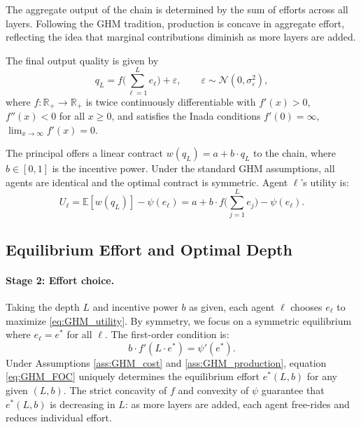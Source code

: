 The aggregate output of the chain is determined by the sum of efforts across all layers. Following the GHM tradition, production is concave in aggregate effort, reflecting the idea that marginal contributions diminish as more layers are added.

\begin{assumption}
\label{ass:GHM_production}
The final output quality is given by
\begin{equation}
\label{eq:GHM_production}
q_L = f\Biggl(\sum_{\ell=1}^{L} e_\ell\Biggr) + \varepsilon, \qquad \varepsilon \sim \mathcal{N}(0, \sigma_\varepsilon^2),
\end{equation}
where $f: \mathbb{R}_+ \to \mathbb{R}_+$ is twice continuously differentiable with $f'(x) > 0$, $f''(x) < 0$ for all $x \geq 0$, and satisfies the Inada conditions $f'(0) = \infty$, $\lim_{x \to \infty} f'(x) = 0$.
\end{assumption}

The principal offers a linear contract $w(q_L) = a + b \cdot q_L$ to the chain, where $b \in [0,1]$ is the incentive power. Under the standard GHM assumptions, all agents are identical and the optimal contract is symmetric. Agent $\ell$'s utility is:
\begin{equation}
\label{eq:GHM_utility}
U_\ell = \mathbb{E}[w(q_L)] - \psi(e_\ell) = a + b \cdot f\Biggl(\sum_{j=1}^{L} e_j\Biggr) - \psi(e_\ell).
\end{equation}

\subsection{Equilibrium Effort and Optimal Depth}

\paragraph{Stage 2: Effort choice.} Taking the depth $L$ and incentive power $b$ as given, each agent $\ell$ chooses $e_\ell$ to maximize \eqref{eq:GHM_utility}. By symmetry, we focus on a symmetric equilibrium where $e_\ell = e^*$ for all $\ell$. The first-order condition is:
\begin{equation}
\label{eq:GHM_FOC}
b \cdot f'(L \cdot e^*) = \psi'(e^*).
\end{equation}
Under Assumptions \ref{ass:GHM_cost} and \ref{ass:GHM_production}, equation \eqref{eq:GHM_FOC} uniquely determines the equilibrium effort $e^*(L, b)$ for any given $(L, b)$. The strict concavity of $f$ and convexity of $\psi$ guarantee that $e^*(L, b)$ is decreasing in $L$: as more layers are added, each agent free-rides and reduces individual effort.

